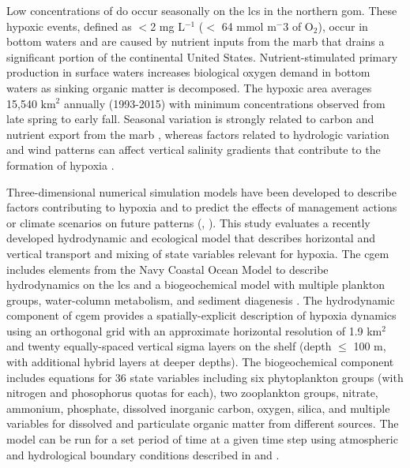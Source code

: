 \documentclass[letterpaper,12pt,oneside]{article}\usepackage[]{graphicx}\usepackage[]{color}
\begin{document}
Low concentrations of \acl{do} occur seasonally on the \ac{lcs} in the northern \ac{gom}.  These hypoxic events, defined as $<$2 mg L$^{-1}$ ($<$ 64 mmol m$^-3$ of O$_2$), occur in bottom waters and are caused by nutrient inputs from the \ac{marb} that drains a significant portion of the continental United States.  Nutrient-stimulated primary production in surface waters increases biological oxygen demand in bottom waters as sinking organic matter is decomposed.  The hypoxic area averages 15,540 km$^2$ annually (1993-2015) with minimum concentrations observed from late spring to early fall.  Seasonal variation is strongly related to carbon and nutrient export from the \ac{marb} \citep{Lohrenz08,Bianchi10}, whereas factors related to hydrologic variation and wind patterns can affect vertical salinity gradients that contribute to the formation of hypoxia \citep{Wiseman97}. 

Three-dimensional numerical simulation models have been developed to describe factors contributing to hypoxia and to predict the effects of management actions or climate scenarios on future patterns (\citealt{Fennel13,Pauer16}, ).  This study evaluates a recently developed hydrodynamic and ecological model that describes horizontal and vertical transport and mixing of state variables relevant for hypoxia.  The \ac{cgem} includes elements from the Navy Coastal Ocean Model \citep{Martin00} to describe hydrodynamics on the \ac{lcs} and a biogeochemical model with multiple plankton groups, water-column metabolism, and sediment diagenesis \citep{Eldridge10}.  The hydrodynamic component of \ac{cgem} provides a spatially-explicit description of hypoxia dynamics using an orthogonal grid with an approximate horizontal resolution of 1.9 km$^2$ and twenty equally-spaced vertical sigma layers on the shelf (depth $\leq$ 100 m, with additional hybrid layers at deeper depths).  The biogeochemical component includes equations for 36 state variables including six phytoplankton groups (with nitrogen and phosophorus quotas for each), two zooplankton groups, nitrate, ammonium, phosphate, dissolved inorganic carbon, oxygen, silica, and multiple variables for dissolved and particulate organic matter from different sources.  The model can be run for a set period of time at a given time step using atmospheric and hydrological boundary conditions described in \citet{Hodur97} and \citet{Lehrter13}.
\end{document}
